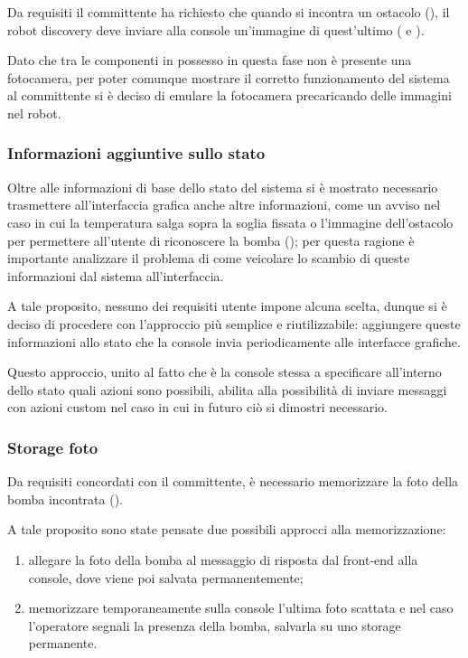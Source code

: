 Da requisiti il committente ha richiesto che quando si incontra un ostacolo (), il robot discovery deve inviare alla console un'immagine di quest'ultimo ( e ).

Dato che tra le componenti in possesso in questa fase non è presente una fotocamera, per poter comunque mostrare il corretto funzionamento del sistema al committente si è deciso di emulare la fotocamera precaricando delle immagini nel robot.

\subsubsection{Informazioni aggiuntive sullo stato}

Oltre alle informazioni di base dello stato del sistema si è mostrato necessario trasmettere all'interfaccia grafica anche altre informazioni, come un avviso nel caso in cui la temperatura salga sopra la soglia fissata o l'immagine dell'ostacolo per permettere all'utente di riconoscere la bomba ();
per questa ragione è importante analizzare il problema di come veicolare lo scambio di queste informazioni dal sistema all'interfaccia.

A tale proposito, nessuno dei requisiti utente impone alcuna scelta, dunque si è deciso di procedere con l'approccio più semplice e riutilizzabile:
aggiungere queste informazioni allo stato che la console invia periodicamente alle interfacce grafiche.

Questo approccio, unito al fatto che è la console stessa a specificare all'interno dello stato quali azioni sono possibili, abilita alla possibilità di inviare messaggi con azioni custom nel caso in cui in futuro ciò si dimostri necessario.

\subsubsection{Storage foto}

Da requisiti concordati con il committente, è necessario memorizzare la foto della bomba incontrata ().

A tale proposito sono state pensate due possibili approcci alla memorizzazione:

\begin{enumerate}
  \item allegare la foto della bomba al messaggio di risposta dal front-end alla console, dove viene poi salvata permanentemente;
  \item memorizzare temporaneamente sulla console l'ultima foto scattata e nel caso l'operatore segnali la presenza della bomba, salvarla su uno storage permanente.
\end{enumerate}

